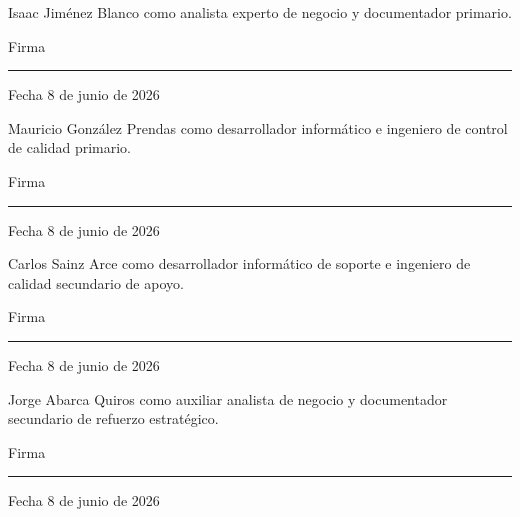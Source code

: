 \documentclass[11pt,spanish]{article}
\begin{document}
Isaac Jiménez Blanco como analista experto de negocio y documentador primario.

Firma \rule{7cm}{0.4pt}

Fecha 8 de junio de 2026

Mauricio González Prendas como desarrollador informático e ingeniero de control de calidad primario.

Firma \rule{7cm}{0.4pt}

Fecha 8 de junio de 2026

Carlos Sainz Arce como desarrollador informático de soporte e ingeniero de calidad secundario de apoyo.

Firma \rule{7cm}{0.4pt}

Fecha 8 de junio de 2026

Jorge Abarca Quiros como auxiliar analista de negocio y documentador secundario de refuerzo estratégico.

Firma \rule{7cm}{0.4pt}

Fecha 8 de junio de 2026
\end{document}

